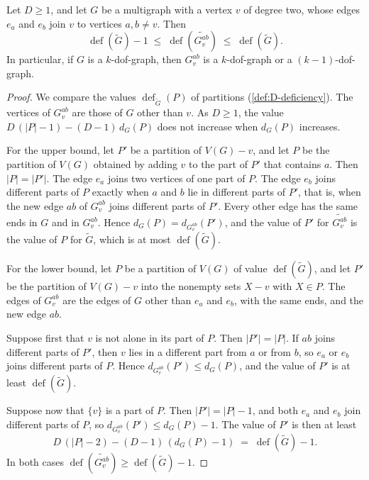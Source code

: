 \begin{lemma}
  \label{lem:splitoff-deficiency}
  \leanok
  Let $D \ge 1$, and let $G$ be a multigraph with a vertex $v$ of degree
  two, whose edges $e_a$ and $e_b$ join $v$ to vertices $a, b \neq v$.
  Then
  \[
    \operatorname{def}(\tilde G) - 1
      \;\le\; \operatorname{def}(\widetilde{G_v^{ab}})
      \;\le\; \operatorname{def}(\tilde G).
  \]
  In particular, if $G$ is a $k$-dof-graph, then $G_v^{ab}$ is a
  $k$-dof-graph or a $(k-1)$-dof-graph.
\end{lemma}
\begin{proof}
  \leanok
  We compare the values $\operatorname{def}_{\tilde G}(P)$ of partitions
  (\cref{def:D-deficiency}). The vertices of $G_v^{ab}$ are those of $G$
  other than $v$. As $D \ge 1$, the value
  $D\,(|P| - 1) - (D - 1)\,d_G(P)$ does not increase when $d_G(P)$
  increases.

  For the upper bound, let $P'$ be a partition of $V(G) - v$, and let
  $P$ be the partition of $V(G)$ obtained by adding $v$ to the part of
  $P'$ that contains $a$. Then $|P| = |P'|$. The edge $e_a$ joins two
  vertices of one part of $P$. The edge $e_b$ joins different parts of
  $P$ exactly when $a$ and $b$ lie in different parts of $P'$, that is,
  when the new edge $ab$ of $G_v^{ab}$ joins different parts of $P'$.
  Every other edge has the same ends in $G$ and in $G_v^{ab}$. Hence
  $d_G(P) = d_{G_v^{ab}}(P')$, and the value of $P'$ for
  $\widetilde{G_v^{ab}}$ is the value of $P$ for $\tilde G$, which is at
  most $\operatorname{def}(\tilde G)$.

  For the lower bound, let $P$ be a partition of $V(G)$ of value
  $\operatorname{def}(\tilde G)$, and let $P'$ be the partition of
  $V(G) - v$ into the nonempty sets $X - v$ with $X \in P$. The edges of
  $G_v^{ab}$ are the edges of $G$ other than $e_a$ and $e_b$, with the
  same ends, and the new edge $ab$.

  Suppose first that $v$ is not alone in its part of $P$. Then
  $|P'| = |P|$. If $ab$ joins different parts of $P'$, then $v$ lies in a
  different part from $a$ or from $b$, so $e_a$ or $e_b$ joins different
  parts of $P$. Hence $d_{G_v^{ab}}(P') \le d_G(P)$, and the value of
  $P'$ is at least $\operatorname{def}(\tilde G)$.

  Suppose now that $\{v\}$ is a part of $P$. Then $|P'| = |P| - 1$, and
  both $e_a$ and $e_b$ join different parts of $P$, so
  $d_{G_v^{ab}}(P') \le d_G(P) - 1$. The value of $P'$ is then at least
  \[
    D\,(|P| - 2) - (D - 1)\,(d_G(P) - 1) \;=\;
    \operatorname{def}(\tilde G) - 1.
  \]
  In both cases
  $\operatorname{def}(\widetilde{G_v^{ab}}) \ge \operatorname{def}(\tilde G) - 1$.
\end{proof}


